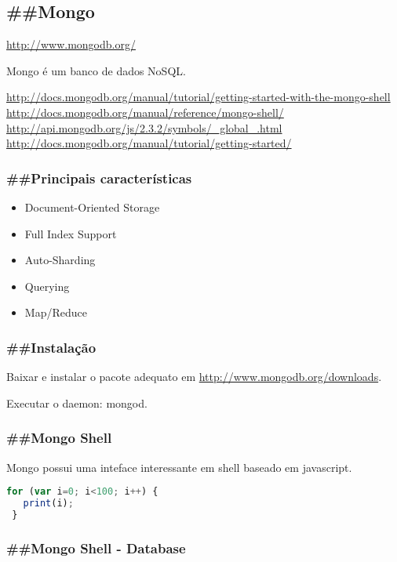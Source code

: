 \documentclass[serif,mathserif]{article}
\begin{document}
\subsection{\#\#Mongo}

\url{http://www.mongodb.org/}

Mongo é um banco de dados NoSQL.

\url{http://docs.mongodb.org/manual/tutorial/getting-started-with-the-mongo-shell}
\url{http://docs.mongodb.org/manual/reference/mongo-shell/}
\url{http://api.mongodb.org/js/2.3.2/symbols/_global_.html}
\url{http://docs.mongodb.org/manual/tutorial/getting-started/}


\subsubsection{\#\#Principais características}
\begin{itemize}
  \item Document-Oriented Storage
  \item Full Index Support
  \item Auto-Sharding
  \item Querying
  \item Map/Reduce
\end{itemize}

\subsubsection{\#\#Instalação}

Baixar e instalar o pacote adequato em \url{http://www.mongodb.org/downloads}.

Executar o daemon: mongod.

\subsubsection{\#\#Mongo Shell}

Mongo possui uma inteface interessante em shell baseado em javascript.

\begin{lstlisting}[language=Javascript]
 for (var i=0; i<100; i++) {
   print(i);
 }
\end{lstlisting}

\subsubsection{\#\#Mongo Shell - Database}
\end{document}
